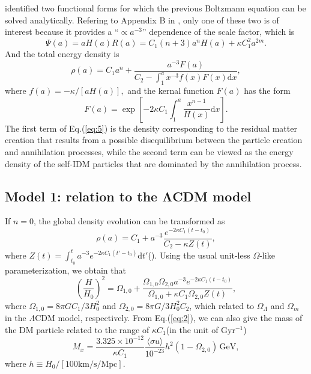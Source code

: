 \documentclass[twocolumn]{aastex631}
\begin{document}
   \cite{refId0} identified two functional forms for which
   the previous Boltzmann equation can be solved analytically.
   Refering to Appendix B in \cite{refId0}, only one of these two is of interest
   because it provides a ``$\propto a^{-3}$'' dependence of the scale factor,
   which is \begin{equation}
      \Psi(a)=aH(a)R(a)=C_1(n+3)a^nH(a)+\kappa C_1^2a^{2m}.
   \end{equation}
   And the total energy density is
   \begin{equation}
      \rho(a)=C_1a^n+\frac{a^{-3}F(a)}{C_2-\int_1^{a}x^{-3}f(x)F(x)\mathrm{d}x},\label{eq:5}
   \end{equation}
   where $f(a)=-\kappa/[aH(a)],$ and the kernal function $F(a)$ has
   the form \begin{equation}
      F(a)=\exp\left[-2\kappa C_1\int_1^{a}\frac{x^{n-1}}{H(x)}\mathrm{d}x\right].
   \end{equation}
   The first term of Eq.(\ref{eq:5}) is the density corresponding to the
   residual matter creation that results from a possible disequilibrium
   between the particle creation and annihilation processes, while the second
   term can be viewed as the energy density of the self-IDM particles that are
   dominated by the annihilation process.

\subsection{Model 1: relation to the ΛCDM model}

   If $n=0$, the global density evolution can be transformed as
   \begin{equation}
      \rho(a)=C_1+a^{-3}\frac{e^{-2\kappa C_1(t-t_0)}}{C_2-\kappa Z(t)},
   \end{equation}
   where $Z(t)=\int_{t_0}^ta^{-3}e^{-2\kappa C_1(t'-t_0)}\mathrm{d}t'$(\cite{refId0}).
   Using the usual unit-less $\Omega$-like parameterization, we obtain that
   \begin{equation}
      \left(\frac{H}{H_0}\right)^2=\Omega_{1,0}+\frac{\Omega_{1,0}\Omega_{2,0}a^{-3}e^{-2\kappa C_1(t-t_0)}}
      {\Omega_{1,0}+\kappa C_1\Omega_{2,0}Z(t)},\label{eq:8}
   \end{equation}
   where $\Omega_{1,0}=8\pi GC_1/3H_0^2$ and $\Omega_{2,0}=8\pi G/3H_0^2C_2$,
   which related to $\Omega_{\Lambda}$ and $\Omega_m$ in the $\Lambda$CDM model,
   respectively.
   From Eq.({\ref{eq:2}}), we can also give the mass of the DM particle
   related to the range of $\kappa C_1$(in the unit of Gyr${}^{-1}$)
   \begin{equation}
      M_x=\frac{3.325\times10^{-12}}{\kappa C_1}
      \frac{\langle\sigma u\rangle}{10^{-23}}h^2(1-\Omega_{2,0})\,\text{GeV},\label{eq:9}
   \end{equation}
   where $h\equiv H_0/[100\text{km/s/Mpc}]$.
\end{document}

